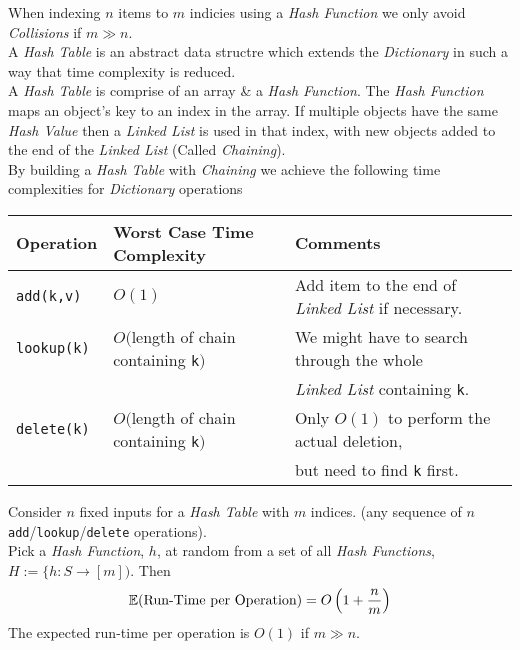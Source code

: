 \documentclass[11pt,a4paper]{article}
\begin{document}

When indexing $n$ items to $m$ indicies using a \textit{Hash Function} we only avoid \textit{Collisions} if $m\gg n$.\\

A \textit{Hash Table} is an abstract data structre which extends the \textit{Dictionary} in such a way that time complexity is reduced.\\
A \textit{Hash Table} is comprise of an array \& a \textit{Hash Function}. The \textit{Hash Function} maps an object's key to an index in the array. If multiple objects have the same \textit{Hash Value} then a \textit{Linked List} is used in that index, with new objects added to the end of the \textit{Linked List} (Called \textit{Chaining}).\\

By building a \textit{Hash Table} with \textit{Chaining} we achieve the following time complexities for \textit{Dictionary} operations
\begin{center}
\begin{tabular}{l|l|l}
\textbf{Operation}&\textbf{Worst Case Time Complexity}&Comments\\\hline
\lstinline!add(k,v)!&$O(1)$&Add item to the end of \textit{Linked List} if necessary.\\
\lstinline!lookup(k)!&$O($length of chain containing \lstinline!k!$)$&We might have to search through the whole\\&&\textit{Linked List} containing \lstinline!k!.\\
\lstinline!delete(k)!&$O($length of chain containing \lstinline!k!$)$&Only $O(1)$ to perform the actual deletion,\\
&&but need to find \lstinline!k! first.
\end{tabular}
\end{center}

Consider $n$ fixed inputs for a \textit{Hash Table} with $m$ indices. (\ie any sequence of $n$ \lstinline!add!/\lstinline!lookup!/\lstinline!delete! operations).\\
Pick a \textit{Hash Function}, $h$, at random from a set of all \textit{Hash Functions}, $H:=\{h:S\to[m])$. Then
$$\mathbb{E}(\text{Run-Time per Operation})=O\left(1+\frac{n}{m}\right)$$
\nb The expected run-time per operation is $O(1)$ if $m\gg n$.\\
\end{document}
